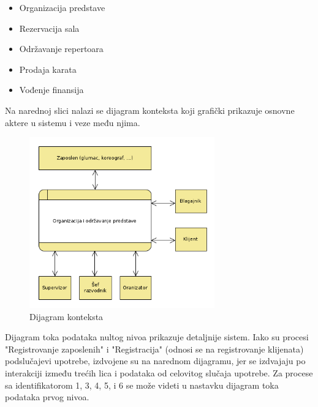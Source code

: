\documentclass[a4paper]{article}
\begin{document}
  \begin{itemize}
    \item Organizacija predstave
    \item Rezervacija sala
    \item Održavanje repertoara
    \item Prodaja karata
    \item Vođenje finansija
  \end{itemize}
  
Na narednoj slici nalazi se dijagram konteksta koji grafički prikazuje
osnovne aktere u sistemu i veze među njima.

\begin{figure}[H]
  \begin{center}
      \includegraphics[width=80mm]{../images/dfd0.png}
  \end{center}
  \caption{Dijagram konteksta}
  \label{dfd0}
\end{figure}

Dijagram toka podataka nultog nivoa prikazuje detaljnije sistem. Iako su procesi "Registrovanje zaposlenih"
i "Registracija" (odnosi se na registrovanje klijenata) podslučajevi upotrebe, izdvojene su na narednom dijagramu,
jer se izdvajaju po interakciji između trećih lica i podataka od celovitog slučaja upotrebe. Za
procese sa identifikatorom 1, 3, 4, 5, i 6 se može videti u nastavku dijagram toka podataka prvog nivoa.
\end{document}

